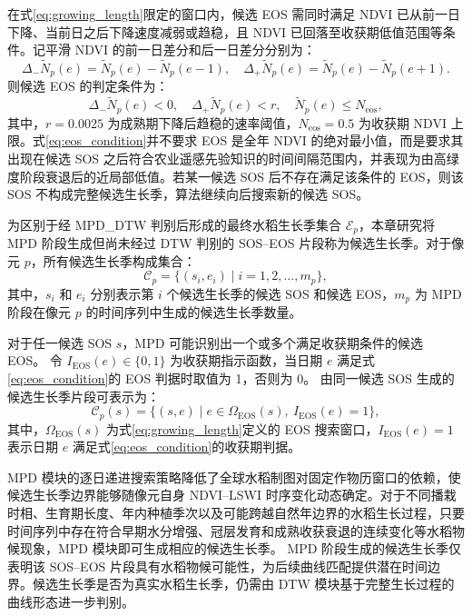在式\ref{eq:growing_length}限定的窗口内，候选 EOS 需同时满足 NDVI 已从前一日下降、当前日之后下降速度减弱或趋稳，且 NDVI 已回落至收获期低值范围等条件。记平滑 NDVI 的前一日差分和后一日差分分别为：
\begin{equation}
    \Delta_{-}\widetilde{N}_p(e)=\widetilde{N}_p(e)-\widetilde{N}_p(e-1),
    \quad
    \Delta_{+}\widetilde{N}_p(e)=\widetilde{N}_p(e)-\widetilde{N}_p(e+1).
    \label{eq:ndvi_derivatives}
\end{equation}
则候选 EOS 的判定条件为：
\begin{equation}
    \Delta_{-}\widetilde{N}_p(e)<0,\quad
    \Delta_{+}\widetilde{N}_p(e)<r,\quad
    \widetilde{N}_p(e)\leq N_{\mathrm{eos}},
    \label{eq:eos_condition}
\end{equation}
其中，\(r=0.0025\) 为成熟期下降后趋稳的速率阈值，\(N_{\mathrm{eos}}=0.5\) 为收获期 NDVI 上限。式\ref{eq:eos_condition}并不要求 EOS 是全年 NDVI 的绝对最小值，而是要求其出现在候选 SOS 之后符合农业遥感先验知识的时间间隔范围内，并表现为由高绿度阶段衰退后的近局部低值。若某一候选 SOS 后不存在满足该条件的 EOS，则该 SOS 不构成完整候选生长季，算法继续向后搜索新的候选 SOS。

为区别于经 MPD\_DTW 判别后形成的最终水稻生长季集合 \(\mathcal{E}_p\)，本章研究将 MPD 阶段生成但尚未经过 DTW 判别的 SOS--EOS 片段称为候选生长季。对于像元 \(p\)，所有候选生长季构成集合：
\begin{equation}
    \mathcal{C}_p = \{(s_i, e_i)\mid i=1,2,\ldots,m_p\},
    \label{eq:candidate_event_set}
\end{equation}
其中，\(s_i\) 和 \(e_i\) 分别表示第 \(i\) 个候选生长季的候选 SOS 和候选 EOS，\(m_p\) 为 MPD 阶段在像元 \(p\) 的时间序列中生成的候选生长季数量。

对于任一候选 SOS \(s\)，MPD 可能识别出一个或多个满足收获期条件的候选 EOS。
令 \(I_{\mathrm{EOS}}(e)\in\{0,1\}\) 为收获期指示函数，当日期 \(e\) 满足式\ref{eq:eos_condition}的 EOS 判据时取值为 1，否则为 0。
由同一候选 SOS 生成的候选生长季片段可表示为：
\begin{equation}
    \mathcal{C}_p(s)=\{(s,e)\mid e\in\Omega_{\mathrm{EOS}}(s),\ I_{\mathrm{EOS}}(e)=1\},
    \label{eq:candidate_set}
\end{equation}
其中，\(\Omega_{\mathrm{EOS}}(s)\) 为式\ref{eq:growing_length}定义的 EOS 搜索窗口，\(I_{\mathrm{EOS}}(e)=1\) 表示日期 \(e\) 满足式\ref{eq:eos_condition}的收获期判据。

MPD 模块的逐日递进搜索策略降低了全球水稻制图对固定作物历窗口的依赖，使候选生长季边界能够随像元自身 NDVI--LSWI 时序变化动态确定。对于不同播栽时相、生育期长度、年内种植季次以及可能跨越自然年边界的水稻生长过程，只要时间序列中存在符合早期水分增强、冠层发育和成熟收获衰退的连续变化等水稻物候现象，MPD 模块即可生成相应的候选生长季。
MPD 阶段生成的候选生长季仅表明该 SOS--EOS 片段具有水稻物候可能性，为后续曲线匹配提供潜在时间边界。候选生长季是否为真实水稻生长季，仍需由 DTW 模块基于完整生长过程的曲线形态进一步判别。

